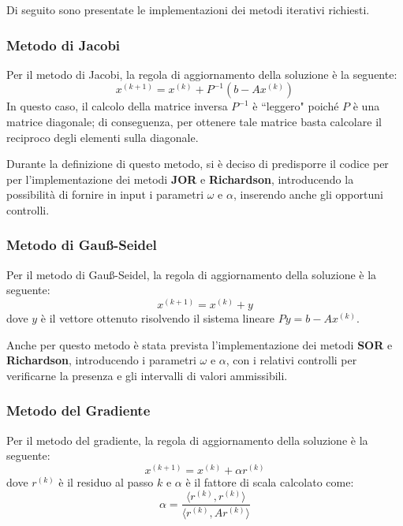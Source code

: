 Di seguito sono presentate le implementazioni dei metodi iterativi richiesti.
\subsubsection{Metodo di Jacobi}
Per il metodo di Jacobi, la regola di aggiornamento della soluzione è la seguente:
\begin{equation}
    x^{(k+1)} = x^{(k)} + P^{-1}(b - Ax^{(k)})
\end{equation}
In questo caso, il calcolo della matrice inversa $P^{-1}$ è ``leggero" poiché $P$
è una matrice diagonale; di conseguenza, per ottenere tale matrice basta calcolare
il reciproco degli elementi sulla diagonale.

Durante la definizione di questo metodo, si è deciso di predisporre il codice per
per l'implementazione dei metodi \textbf{JOR} e \textbf{Richardson}, introducendo
la possibilità di fornire in input i parametri $\omega$ e $\alpha$, inserendo anche
gli opportuni controlli.
\subsubsection{Metodo di Gauß-Seidel}
Per il metodo di Gauß-Seidel, la regola di aggiornamento della soluzione è la seguente:
\begin{equation}
    x^{(k+1)} = x^{(k)} + y
\end{equation}
dove $y$ è il vettore ottenuto risolvendo il sistema lineare $Py = b - Ax^{(k)}$.

Anche per questo metodo è stata prevista l'implementazione dei metodi \textbf{SOR}
e \textbf{Richardson}, introducendo i parametri $\omega$ e $\alpha$, con i relativi
controlli per verificarne la presenza e gli intervalli di valori ammissibili.

\subsubsection{Metodo del Gradiente}
Per il metodo del gradiente, la regola di aggiornamento della soluzione è la seguente:
\begin{equation}
    x^{(k+1)} = x^{(k)} + \alpha r^{(k)}
\end{equation}
dove $r^{(k)}$ è il residuo al passo $k$ e $\alpha$ è il fattore di scala calcolato
come:
\begin{equation}
    \alpha = \frac{\langle r^{(k)}, r^{(k)}\rangle}{\langle r^{(k)}, Ar^{(k)}\rangle}
\end{equation}

